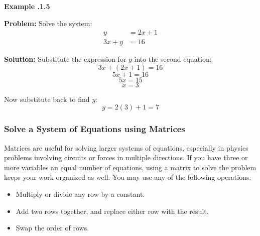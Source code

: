 \begin{mdframed}[backgroundcolor=blue!10!white]
	\begin{center}
		
		
		\textbf{Example \thesection.1.5}	
	\end{center}
	
	\textbf{Problem:}
	Solve the system:
	\[
	\begin{aligned}
		y &= 2x + 1 \\
		3x + y &= 16
	\end{aligned}
	\]


\textbf{Solution:} Substitute the expression for \( y \) into the second equation:
\begin{equation*}
3x + (2x + 1) = 16 	
\end{equation*}
\begin{equation*}
	 5x + 1 = 16 
\end{equation*}
\begin{equation*}
	 5x = 15
	 \end{equation*}
 \begin{equation*}
 	x = 3
 \end{equation*} 

Now substitute back to find \( y \):
\[
y = 2(3) + 1 = 7
\]

\end{mdframed}

\newpage
\subsubsection{Solve a System of Equations using Matrices}

Matrices are useful for solving larger systems of equations, especially in physics problems involving circuits or forces in multiple directions.  If you have three or more variables an equal number of equations, using a matrix to solve the problem keeps your work organized as well.  You may use any of the following operations:
\begin{itemize}
	\item Multiply or divide any row by a constant.
	\item Add two rows together, and replace either row with the result.
	\item Swap the order of rows.
\end{itemize}


